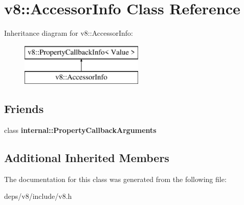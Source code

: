 \hypertarget{classv8_1_1_accessor_info}{}\section{v8\+:\+:Accessor\+Info Class Reference}
\label{classv8_1_1_accessor_info}
Inheritance diagram for v8\+:\+:Accessor\+Info\+:\begin{figure}[H]
\begin{center}
\leavevmode
\includegraphics[height=2.000000cm]{classv8_1_1_accessor_info}
\end{center}
\end{figure}
\subsection*{Friends}
\begin{DoxyCompactItemize}
\item 
\hypertarget{classv8_1_1_accessor_info_a1ba96a1268a72c23f50314cd99c76f1b}{}class {\bfseries internal\+::\+Property\+Callback\+Arguments}\label{classv8_1_1_accessor_info_a1ba96a1268a72c23f50314cd99c76f1b}

\end{DoxyCompactItemize}
\subsection*{Additional Inherited Members}


The documentation for this class was generated from the following file\+:\begin{DoxyCompactItemize}
\item 
deps/v8/include/v8.\+h\end{DoxyCompactItemize}
